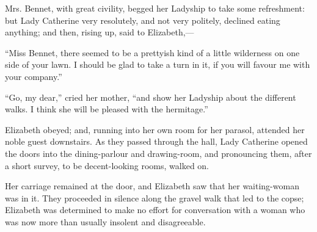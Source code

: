 \documentclass[10pt]{book}
\begin{document}
   Mrs. Bennet, with great civility, begged her Ladyship to take some
refreshment: but Lady Catherine very resolutely, and not very politely,
declined eating anything; and then, rising up, said to Elizabeth,—
  

   “Miss Bennet, there seemed to be a prettyish kind of a little wilderness
on one side of your lawn. I should be glad to take a turn in it, if you
will favour me with your company.”
  

   “Go, my dear,” cried her mother, “and show her Ladyship about the
different walks. I think she will be pleased with the hermitage.”
  

   Elizabeth obeyed; and, running into her own room for her parasol,
attended her noble guest downstairs. As they passed through the hall,
Lady Catherine opened the doors into the dining-parlour and
drawing-room, and pronouncing them, after a short survey, to be
decent-looking rooms, walked on.
  

   Her carriage remained at the door, and Elizabeth saw that her
waiting-woman was in it. They proceeded in silence along the gravel walk
that led to the copse; Elizabeth was determined to make no effort for
conversation with a woman who was now more than usually insolent and
disagreeable.
  
\end{document}

